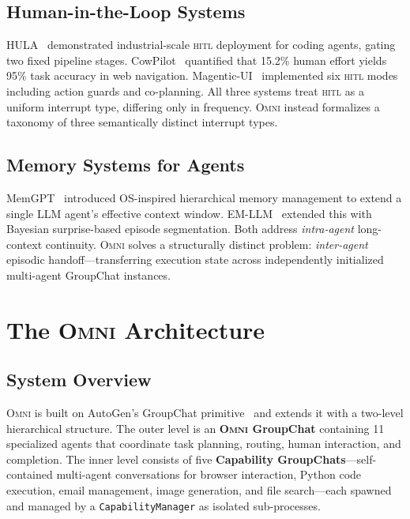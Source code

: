 \documentclass[11pt,a4paper]{article}
\newcommand{\omni}{\textsc{Omni}}
\newcommand{\hitl}{\textsc{hitl}}
\begin{document}
\subsection{Human-in-the-Loop Systems}

HULA~\cite{rasheed2024hula} demonstrated industrial-scale \hitl{} deployment for coding agents, gating two fixed pipeline stages. CowPilot~\cite{cowpilot2025} quantified that 15.2\% human effort yields 95\% task accuracy in web navigation. Magentic-UI~\cite{microsoft2025magenticui} implemented six \hitl{} modes including action guards and co-planning. All three systems treat \hitl{} as a uniform interrupt type, differing only in frequency. \omni{} instead formalizes a taxonomy of three semantically distinct interrupt types.

\subsection{Memory Systems for Agents}

MemGPT~\cite{packer2023memgpt} introduced OS-inspired hierarchical memory management to extend a single LLM agent's effective context window. EM-LLM~\cite{fountas2024emllm} extended this with Bayesian surprise-based episode segmentation. Both address \emph{intra-agent} long-context continuity. \omni{} solves a structurally distinct problem: \emph{inter-agent} episodic handoff---transferring execution state across independently initialized multi-agent GroupChat instances.

\section{The \omni{} Architecture}
\label{sec:architecture}

\subsection{System Overview}

\omni{} is built on AutoGen's GroupChat primitive~\cite{wu2024autogen} and extends it with a two-level hierarchical structure. The outer level is an \textbf{\omni{} GroupChat} containing 11 specialized agents that coordinate task planning, routing, human interaction, and completion. The inner level consists of five \textbf{Capability GroupChats}---self-contained multi-agent conversations for browser interaction, Python code execution, email management, image generation, and file search---each spawned and managed by a \texttt{CapabilityManager} as isolated sub-processes.
\end{document}
